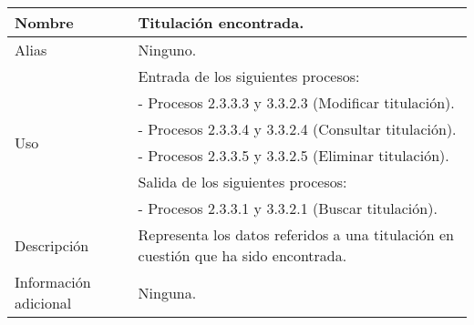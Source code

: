 \begin{center}
  \begin{tabular}{| l | p{9cm} |}
    \hline
    Nombre & \textbf{Titulación encontrada}.\\
    \hline
    Alias & Ninguno.\\
    \hline
    \multirow{6}{*}{Uso} & Entrada de los siguientes procesos:\\
                         & - Procesos 2.3.3.3 y 3.3.2.3 (Modificar titulación).\\
                         & - Procesos 2.3.3.4 y 3.3.2.4 (Consultar titulación).\\
                         & - Procesos 2.3.3.5 y 3.3.2.5 (Eliminar titulación).\\
                         & Salida de los siguientes procesos:\\
                         & - Procesos 2.3.3.1 y 3.3.2.1 (Buscar titulación).\\
    \hline
    Descripción & Representa los datos referidos a una titulación en cuestión
                  que ha sido encontrada.\\
    \hline
    Información adicional & Ninguna.\\
    \hline
  \end{tabular}
\end{center}
